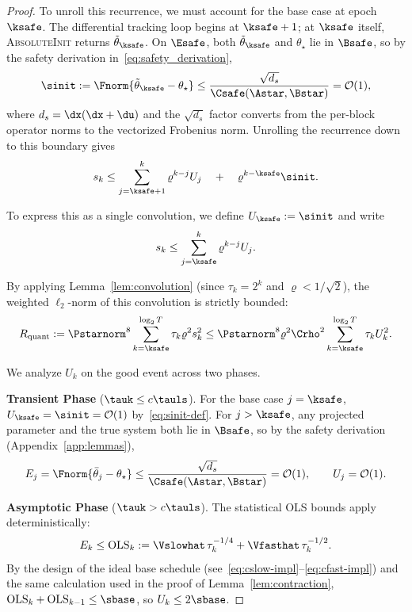 \documentclass[11pt,journal,onecolumn]{IEEEtran}
\begin{document}
\begin{proof}
    To unroll this recurrence, we must account for the base case at epoch $\ksafe$. The differential tracking loop begins at $\ksafe+1$; at $\ksafe$ itself, \textsc{AbsoluteInit} returns $\tilde\theta_{\ksafe}$. On $\Esafe$, both $\tilde\theta_{\ksafe}$ and $\theta_\star$ lie in $\Bsafe$, so by the safety derivation in~\eqref{eq:safety_derivation},
    \begin{equation}\label{eq:sinit-def}
        \sinit := \Fnorm{\tilde\theta_{\ksafe} - \theta_\star} \le \frac{\sqrt{d_s}}{\Csafe(\Astar,\Bstar)} = \mathcal{O}(1),
    \end{equation}
    where $d_s = \dx(\dx+\du)$ and the $\sqrt{d_s}$ factor converts from the per-block operator norms to the vectorized Frobenius norm.
    Unrolling the recurrence down to this boundary gives
    \begin{equation}
        s_k \le \sum_{j=\ksafe+1}^k \varrho^{k-j} U_j \quad + \quad \varrho^{k-\ksafe} \sinit.
    \end{equation}

    To express this as a single convolution, we define $U_{\ksafe} := \sinit$ and write
    \begin{equation}
        \label{eq:envelope}
        s_k \le \sum_{j=\ksafe}^k \varrho^{k-j} U_j.
    \end{equation}

    By applying Lemma~\ref{lem:convolution} (since $\tau_k = 2^k$ and $\varrho < 1/\sqrt{2}$), the weighted $\ell_2$-norm of this convolution is strictly bounded:
    \begin{equation}\label{eq:Rquant-def}
        R_{\mathrm{quant}} := \Pstarnorm^8 \sum_{k=\ksafe}^{\log_2 T} \tau_k \varrho^2 s_k^2 \le \Pstarnorm^8 \varrho^2 \Crho^2 \sum_{k=\ksafe}^{\log_2 T} \tau_k U_k^2.
    \end{equation}

    We analyze $U_k$ on the good event across two phases.

    \medskip\noindent\textbf{Transient Phase} ($\tauk \le c\tauls$).
    For the base case $j=\ksafe$, $U_{\ksafe} = \sinit = \mathcal{O}(1)$ by~\eqref{eq:sinit-def}. For $j > \ksafe$, any projected parameter and the true system both lie in $\Bsafe$, so by the safety derivation (Appendix~\ref{app:lemmas}),
    \[
        E_j = \Fnorm{\bar\theta_j - \theta_\star} \le \frac{\sqrt{d_s}}{\Csafe(\Astar,\Bstar)} = \mathcal{O}(1), \qquad U_j = \mathcal{O}(1).
    \]

    \medskip\noindent\textbf{Asymptotic Phase} ($\tauk > c\tauls$).
    The statistical OLS bounds apply deterministically:
    \[
        E_k \le \mathrm{OLS}_k := \Vslowhat\,\tau_k^{-1/4} + \Vfasthat\,\tau_k^{-1/2}.
    \]
    By the design of the ideal base schedule (see~\eqref{eq:cslow-impl}--\eqref{eq:cfast-impl}) and the same calculation used in the proof of Lemma~\ref{lem:contraction}, $\mathrm{OLS}_k + \mathrm{OLS}_{k-1} \le \sbase$, so $U_k \le 2\sbase$.


\end{proof}
\end{document}
